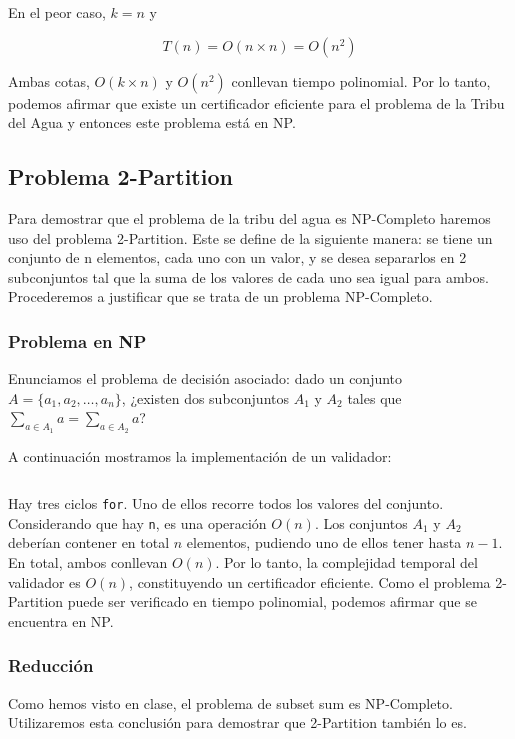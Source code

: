 \documentclass{article}
\begin{document}
En el peor caso, $k = n$ y

$$
T(n) = O(n \times n) = O(n^2)
$$

Ambas cotas, $O(k \times n)$ y $O(n^2)$ conllevan tiempo polinomial. Por lo tanto, podemos afirmar que existe un certificador eficiente para el problema de la Tribu del Agua y entonces este problema está en NP.

\subsection{Problema 2-Partition}
\label{subsec:partition}

Para demostrar que el problema de la tribu del agua es NP-Completo haremos uso del problema 2-Partition. Este se define de la siguiente manera: se tiene un conjunto de n elementos, cada uno con un valor, y se desea separarlos en 2 subconjuntos tal que la suma de los valores de cada uno sea igual para ambos. Procederemos a justificar que se trata de un problema NP-Completo.

\subsubsection{Problema en NP}
Enunciamos el problema de decisión asociado: dado un conjunto \( A =\{a_1, a_2, \ldots, a_n\} \), ¿existen dos subconjuntos \( A_1 \) y \( A_2 \) tales que \( \sum_{a \in A_1} a = \sum_{a \in A_2} a \)?

A continuación mostramos la implementación de un validador:
\inputminted[linenos]{python}{codigo/certificador_2_partition.py}

Hay tres ciclos \texttt{for}. Uno de ellos recorre todos los valores del conjunto. Considerando que hay \texttt{n}, es una operación $O(n)$. Los conjuntos $A_1$ y $A_2$ deberían contener en total $n$ elementos, pudiendo uno de ellos tener hasta  $n-1$. En total, ambos conllevan $O(n)$. Por lo tanto, la complejidad temporal del validador es $O(n)$, constituyendo un certificador eficiente. Como el problema 2-Partition puede ser verificado en tiempo polinomial, podemos afirmar que se encuentra en NP.

\subsubsection{Reducción}
\label{sec:np-completo-2p}

Como hemos visto en clase, el problema de subset sum es NP-Completo. Utilizaremos esta conclusión para demostrar que 2-Partition también lo es.
\end{document}
